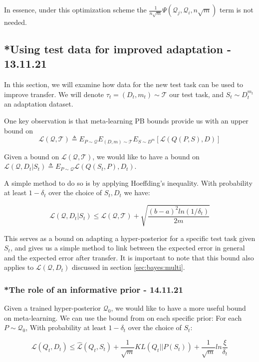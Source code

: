 \documentclass[letterpaper]{article}
\theoremstyle{definition}
\begin{document}
In essence, under this optimization scheme the $\frac{1}{n\sqrt{m}}\Psi(\mathcal{Q}_j, \mathcal{Q}_i, n\sqrt{m})$ term is not needed.

\subsection{*Using test data for improved adaptation - 13.11.21}
In this section, we will examine how data for the new test task can be used to improve transfer.
We will denote $\tau_t=(D_t, m_t)\sim \mathcal{T}$ our test task, and $S_t\sim D_t^{m_t}$ an adaptation dataset.

One key observation is that meta-learning PB bounds provide us with an upper bound on $$\mathcal{L}(\mathcal{Q}, \mathcal{T})\triangleq E_{P\sim \mathcal{Q}}E_{(D, m)\sim \mathcal{T}}E_{S\sim D^m}\left [\mathcal{L}(Q(P, S), D)\right ]$$

Given a bound on $\mathcal{L}(\mathcal{Q}, \mathcal{T})$, we would like to have a bound on $\mathcal{L}(\mathcal{Q}, D_t|S_t)\triangleq E_{P\sim \mathcal{Q}}\mathcal{L}(Q(S_t, P), D_t)$.

A simple method to do so is by applying Hoeffding's inequality. With probability at least $1-\delta_t$ over the choice of $S_t, D_t$ we have:

\begin{equation}
\mathcal{L}(\mathcal{Q}, D_t|S_t) \leq \mathcal{L}(\mathcal{Q}, \mathcal{T}) + \sqrt{\frac{(b-a)^2 ln(1/\delta_t)}{2m}}
\end{equation}

This serves as a bound on adapting a hyper-posterior for a specific test task given $S_t$, and gives us a simple method to link between the expected error in general and the expected error after transfer. It is important to note that this bound also applies to $\mathcal{L}(\mathcal{Q}, D_t)$ discussed in section \ref{sec:bayes:multi}.

\subsubsection{*The role of an informative prior - 14.11.21}

Given a trained hyper-posterior $\mathcal{Q}_0$, we would like to have a more useful bound on meta-learning. We can use the bound from \cite{Rivasplata2020} on each specific prior:
For each $P\sim \mathcal{Q}_0$, With probability at least $1-\delta_t$ over the choice of $S_t$: 

$$\mathcal{L}(Q_t, D_t) \leq \hat{\mathcal{L}}(Q_t, S_t) + \frac{1}{\sqrt{m}}KL(Q_t|| P(S_t)) + \frac{1}{\sqrt{m}}ln\frac{\xi}{\delta_t}$$
\end{document}
